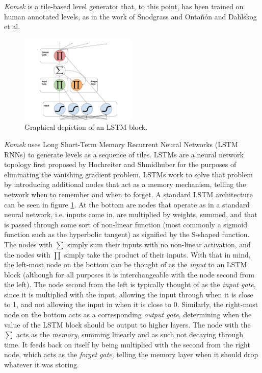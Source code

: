 \documentclass[12pt]{report}
\begin{document}
\textit{Kamek} is a tile-based level generator that, to this point, has been trained on human annotated levels, as in the work of Snodgrass and Onta{\~n}{\'o}n and Dahlskog et al.  

\begin{figure}[ht]
\centering
    \includegraphics[width=0.5\textwidth]{figures/LSTM_Cell.png}
    \caption{Graphical depiction of an LSTM block. }
    \label{fig:LSTM}
\end{figure}

\textit{Kamek} uses Long Short-Term Memory Recurrent Neural Networks (LSTM RNNs) to generate levels as a sequence of tiles.
LSTMs are a neural network topology first proposed by Hochreiter  and Shmidhuber \cite{LSTM} for the purposes of eliminating the vanishing gradient problem.  LSTMs work to solve that problem by introducing additional nodes that act as a memory mechanism, telling the network when to remember and when to forget.  A standard LSTM architecture can be seen in figure \ref{fig:LSTM}.  At the bottom
are nodes that operate as in a standard neural network, i.e. inputs come in, are multiplied by weights, summed, and that is passed through some sort of non-linear function (most commonly a sigmoid function such as the hyperbolic tangent) as signified by the S-shaped function.  The nodes with $\sum$ simply sum their inputs with no non-linear activation, and the nodes with $\prod$ simply take the product of their inputs.  With that in mind, the left-most node on the bottom can be thought of as the \textit{input} to an LSTM block (although for all purposes it is interchangeable with the node second from the left).  The node second from the left is typically thought of as the \textit{input gate}, since it is multiplied with the input, allowing the input through when it is close to 1, and not allowing the input in when it is close to 0.  Similarly, the right-most node on the bottom acts as a corresponding \textit{output gate}, determining when the value of the LSTM block should be output to higher layers.  The node with the $\sum$ acts as the \textit{memory}, summing linearly and as such not decaying through time.  It feeds back on itself by being multiplied with the second from the right node, which acts as the \textit{forget gate}, telling the memory layer when it should drop whatever it was storing. 
\end{document}
